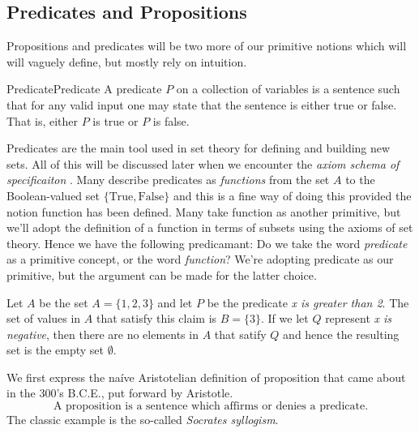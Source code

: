     \subsection{Predicates and Propositions}
        Propositions and predicates will be two more of our primitive notions
        which will will vaguely define, but mostly rely on intuition.
        \begin{fdefinition}{Predicate}{Predicate}
            A predicate $P$ on a collection of variables is a sentence such that
            for any valid input one may state that the sentence is either true
            or false. That is, either $P$ is true or $P$ is false.
        \end{fdefinition}
        Predicates are the main tool used in set theory for defining and
        building new sets. All of this will be discussed later when we
        encounter the \textit{axiom schema of specificaiton}%
        . Many describe predicates as
        \textit{functions} from the set $A$ to the Boolean-valued set
        $\{\text{True},\text{False}\}$ and this is a fine way of doing this
        provided the notion function has been defined. Many take function as
        another primitive, but we'll adopt the definition of a function in terms
        of subsets using the axioms of set theory. Hence we have the following
        predicamant: Do we take the word \textit{predicate} as a primitive
        concept, or the word \textit{function}? We're adopting predicate as our
        primitive, but the argument can be made for the latter choice.
        \begin{example}
            Let $A$ be the set $A=\{1,2,3\}$ and let $P$ be the predicate
            \textit{x is greater than 2}. The set of values in $A$ that satisfy
            this claim is $B=\{3\}$. If we let $Q$ represent
            \textit{x is negative}, then there are no elements in $A$ that
            satify $Q$ and hence the resulting set is the empty set $\emptyset$.
        \end{example}
        We first express the na\'{i}ve Aristotelian definition of proposition
        that came about in the 300's B.C.E., put forward by
        Aristotle.
        \begin{equation}
            \text{A proposition is a sentence which affirms or denies a }
            \text{predicate.}
        \end{equation}
        The classic example is the so-called
        \textit{Socrates syllogism}.
